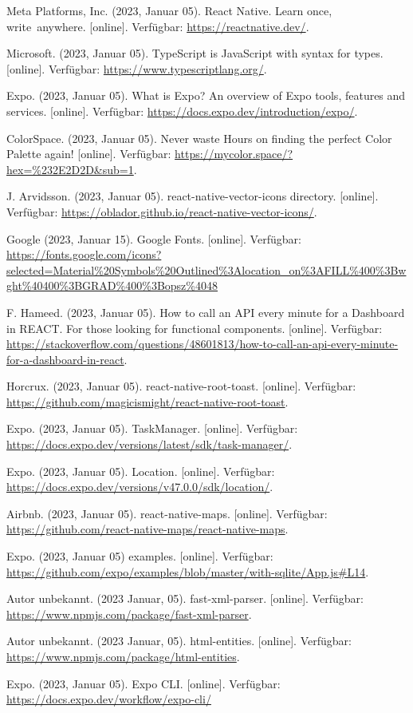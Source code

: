 \documentclass[12pt,oneside]{report}
\begin{document}
  \begin{thebibliography}{10}
  	 Meta Platforms, Inc. (2023, Januar 05). React Native. Learn once, write anywhere. [online]. Verfügbar: \url{https://reactnative.dev/}.
  	
  	 Microsoft. (2023, Januar 05). TypeScript is JavaScript with syntax for types. [online]. Verfügbar: \url{https://www.typescriptlang.org/}.
  	
  	 Expo. (2023, Januar 05). What is Expo? An overview of Expo tools, features and services. [online]. Verfügbar: \url{https://docs.expo.dev/introduction/expo/}.
  	
  	 ColorSpace. (2023, Januar 05). Never waste Hours on finding the perfect Color Palette again! [online]. Verfügbar: \url{https://mycolor.space/?hex=%232E2D2D&sub=1}.
  	
  	 J. Arvidsson. (2023, Januar 05). react-native-vector-icons directory. [online]. Verfügbar: \url{https://oblador.github.io/react-native-vector-icons/}.
  	
  	 Google (2023, Januar 15). Google Fonts. [online]. Verfügbar: \url{https://fonts.google.com/icons?selected=Material%20Symbols%20Outlined%3Alocation_on%3AFILL%400%3Bwght%40400%3BGRAD%400%3Bopsz%4048}
  	
	 F. Hameed. (2023, Januar 05). How to call an API every minute for a Dashboard in REACT. For those looking for functional components. [online]. Verfügbar: \url{https://stackoverflow.com/questions/48601813/how-to-call-an-api-every-minute-for-a-dashboard-in-react}.
	
	 Horcrux. (2023, Januar 05). react-native-root-toast. [online]. Verfügbar: \url{https://github.com/magicismight/react-native-root-toast}.
	
	 Expo. (2023, Januar 05). TaskManager. [online]. Verfügbar: \url{https://docs.expo.dev/versions/latest/sdk/task-manager/}.
	
	 Expo. (2023, Januar 05). Location. [online]. Verfügbar: \url{https://docs.expo.dev/versions/v47.0.0/sdk/location/}.
	
	 Airbnb. (2023, Januar 05). react-native-maps. [online]. Verfügbar: \url{https://github.com/react-native-maps/react-native-maps}.
	
	 Expo. (2023, Januar 05) examples. [online]. Verfügbar: \url{https://github.com/expo/examples/blob/master/with-sqlite/App.js#L14}.
	
	 Autor unbekannt. (2023 Januar, 05). fast-xml-parser. [online]. Verfügbar: \url{https://www.npmjs.com/package/fast-xml-parser}.
	
	 Autor unbekannt. (2023 Januar, 05). html-entities. [online]. Verfügbar: \url{https://www.npmjs.com/package/html-entities}.
	
	 Expo. (2023, Januar 05). Expo CLI. [online]. Verfügbar: \url{https://docs.expo.dev/workflow/expo-cli/}
  \end{thebibliography}
  \newpage
  
  \listoffigures
  \newpage
  \renewcommand{\lstlistlistingname}{Listingverzeichnis}
  \lstlistoflistings
  
\end{document}
